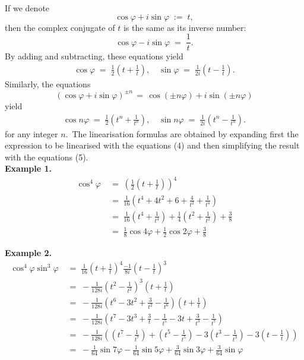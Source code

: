 \documentclass[12pt]{article}
\theoremstyle{definition}
\begin{document}
If we denote
$$\cos\varphi+i\sin\varphi \;:=\; t,$$
then the complex conjugate of $t$ is the same as its inverse number:
$$\cos\varphi-i\sin\varphi \;=\; \frac{1}{t}.$$
By adding and subtracting, these equations yield
\begin{align}
\cos\varphi \;=\; \frac{1}{2}\left(t+\frac{1}{t}\right), \quad \sin\varphi \;=\; \frac{1}{2i}\left(t-\frac{1}{t}\right).
\end{align}
Similarly, the equations
$$(\cos\varphi+i\sin\varphi)^{\pm n} \,=\, \cos(\pm n\varphi)+i\sin(\pm n\varphi)$$
yield
\begin{align}
\cos{n\varphi} \;=\; \frac{1}{2}\left(t^n+\frac{1}{t^n}\right), \quad 
\sin{n\varphi} \;=\; \frac{1}{2i}\left(t^n-\frac{1}{t^n}\right).
\end{align}
for any integer $n$.\, The linearisation formulas are obtained by expanding first the expression to be linearised with the equations (4) and then simplifying the result with the equations (5).\\

\textbf{Example 1.}
\begin{align*}
\cos^4\varphi & \;=\; \left(\frac{1}{2}\left(t+\frac{1}{t}\right)\right)^4\\
& \;=\; \frac{1}{16}\left(t^4+4t^2+6+\frac{4}{t^2}+\frac{1}{t^4}\right)\\
& \;=\; \frac{1}{16}\left(t^4+\frac{1}{t^4}\right)+\frac{1}{4}\left(t^2+\frac{1}{t^2}\right)+\frac{3}{8}\\
& \;=\; \frac{1}{8}\cos4\varphi+\frac{1}{2}\cos2\varphi+\frac{3}{8}
\end{align*}

\textbf{Example 2.}
\begin{align*}
\cos^4\varphi\sin^3\varphi &\;=\; \frac{1}{16}\left(t+\frac{1}{t}\right)^4\frac{-1}{8i}\left(t-\frac{1}{t}\right)^3\\
&\;=\; -\frac{1}{128i}\left(t^2-\frac{1}{t^2}\right)^3\left(t+\frac{1}{t}\right)\\
&\;=\; -\frac{1}{128i}\left(t^6-3t^2+\frac{3}{t^2}-\frac{1}{t^6}\right)\left(t+\frac{1}{t}\right)\\
&\;=\; -\frac{1}{128i}\left(t^7-3t^3+\frac{3}{t}-\frac{1}{t^5}-3t+\frac{3}{t^3}-\frac{1}{t^7}\right)\\
&\;=\; -\frac{1}{128i}\left(\left(t^7-\frac{1}{t^7}\right)+\left(t^5-\frac{1}{t^5}\right)
-3\left(t^3-\frac{1}{t^3}\right)-3\left(t-\frac{1}{t}\right)\right)\\
&\;=\; -\frac{1}{64}\sin7\varphi-\frac{1}{64}\sin5\varphi+\frac{3}{64}\sin3\varphi+\frac{3}{64}\sin\varphi
\end{align*}
\end{document}
